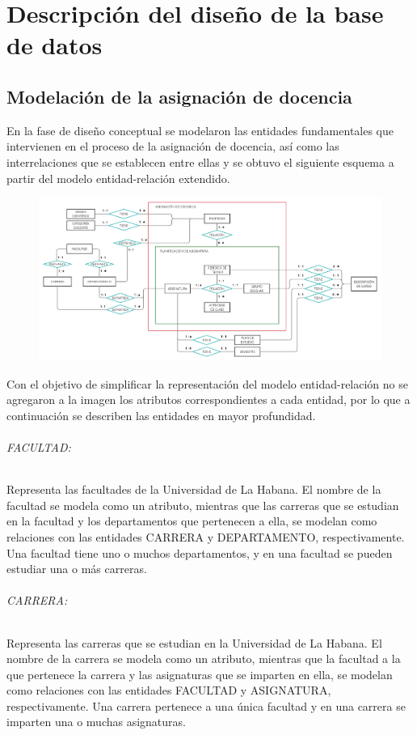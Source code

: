 \chapter{Descripción del diseño de la base de datos}\label{chapter:database}

\section{Modelación de la asignación de docencia}
En la fase de diseño conceptual se modelaron las entidades fundamentales
que intervienen en el proceso de la asignación de docencia, 
así como las interrelaciones que se establecen entre ellas
y se obtuvo el siguiente
esquema a partir del modelo entidad-relación extendido.

\begin{figure}[H]
    \includegraphics[scale=0.2]{Graphics/Database/MERXX-TA-FINAL.png}
\end{figure}


Con el objetivo de simplificar la representación del modelo entidad-relación
no se agregaron a la imagen los atributos correspondientes a cada entidad, por lo 
que a continuación se describen las entidades en mayor profundidad.


\subparagraph{FACULTAD:}
Representa las facultades de la Universidad de La Habana.
El nombre de la facultad se modela como un atributo, mientras que 
las carreras que se estudian en la facultad y los departamentos que pertenecen 
a ella, se modelan como relaciones con las entidades CARRERA y DEPARTAMENTO, respectivamente.
Una facultad tiene uno o muchos departamentos, y en 
una facultad se pueden estudiar una o más carreras.

\subparagraph{CARRERA:}
Representa las carreras que se estudian en la Universidad de La Habana.
El nombre de la carrera se modela como un atributo, mientras que la facultad a la que pertenece la carrera y
las asignaturas que se imparten en ella, se modelan como relaciones con las entidades FACULTAD y
ASIGNATURA, respectivamente. 
Una carrera pertenece a una única facultad y en una carrera se imparten una o muchas asignaturas.

